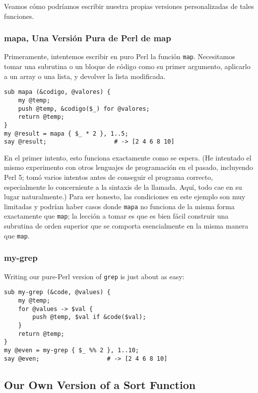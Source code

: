 Veamos cómo podríamos escribir nuestra propias versiones
personalizadas de tales funciones.

\subsubsection{mapa, Una Versión Pura de Perl de map}

Primeramente, intentemos escribir en puro Perl la función {\tt map}.
Necesitamos tomar una subrutina o un bloque de código
como su primer argumento, aplicarlo a un array o una lista,
y devolver la lista modificada.

\begin{verbatim}
sub mapa (&codigo, @valores) { 
    my @temp;
    push @temp, &codigo($_) for @valores;
    return @temp;
}
my @result = mapa { $_ * 2 }, 1..5; 
say @result;                   # -> [2 4 6 8 10]
\end{verbatim}

En el primer intento, esto funciona exactamente como se espera.
(He intentado el mismo experimento con otros lenguajes de 
programación en el pasado, incluyendo Perl 5; tomó
varios intentos antes de conseguir el programa correcto, 
especialmente lo concerniente a la sintaxis de la llamada.
Aquí, todo cae en su lugar naturalmente.) Para ser honesto, 
las condiciones en este ejemplo son muy limitadas y podrían
haber casos donde {\tt mapa} no funciona de la misma forma
exactamente que {\tt map}; la lección a tomar es que es bien
fácil construir una subrutina de orden superior que se comporta 
esencialmente en la misma manera que {\tt map}.

\subsubsection{my-grep}

Writing our pure-Perl version of {\tt grep} is just about as 
easy:
\begin{verbatim}
sub my-grep (&code, @values) { 
    my @temp;
    for @values -> $val {
        push @temp, $val if &code($val);
    }
    return @temp;
}
my @even = my-grep { $_ %% 2 }, 1..10; 
say @even;                   # -> [2 4 6 8 10]
\end{verbatim}

\subsection{Our Own Version of a Sort Function}
\label{combsort}

